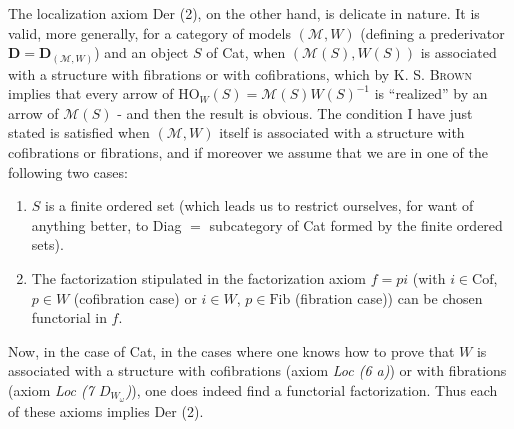 \documentclass[11pt]{article}
\newcommand{\msp}[1]{\marginpar{\footnotesize [#1]}}
\begin{document}
The localization axiom Der (2), on the other hand, is delicate in nature. It is valid, more generally, for a category of models $(\mathcal{M},W)$ (defining a prederivator $\mathbf{D} = \mathbf{D}_{(\mathcal{M},W)}$) and an object $S$ of Cat, when $(\mathcal{M}(S),W(S))$ is associated with a structure with fibrations or with cofibrations, which by K. S. \textsc{Brown} implies that every arrow of $\mathrm{HO}_W(S) = \mathcal{M}(S)W(S)^{-1}$ is ``realized'' by an arrow of $\mathcal{M}(S)$ - and then the result is obvious. The condition I have just stated is satisfied when $(\mathcal{M},W)$ itself is associated with a structure with cofibrations or fibrations,
\msp{page 110}
and if moreover we assume that we are in one of the following two cases: %
\begin{enumerate}[label=\alph*)]
\item $S$ is a finite ordered set (which leads us to restrict ourselves, for want of anything better, to Diag $=$ subcategory of Cat formed by the finite ordered sets).
\item The factorization stipulated in the factorization axiom $f = pi$ (with $i \in \mathrm{Cof}$, $p \in W$ (cofibration case) or $i \in W$, $p \in \mathrm{Fib}$ (fibration case)) can be chosen functorial in $f$.
\end{enumerate}
Now, in the case of Cat, in the cases where one knows how to prove that $W$ is associated with a structure with cofibrations (axiom \textit{Loc (6 a)}) or with fibrations (axiom \textit{Loc (7 $D_{W_\omega}$)}), one does indeed find a functorial factorization. Thus each of these axioms implies Der (2). %
\end{document}
